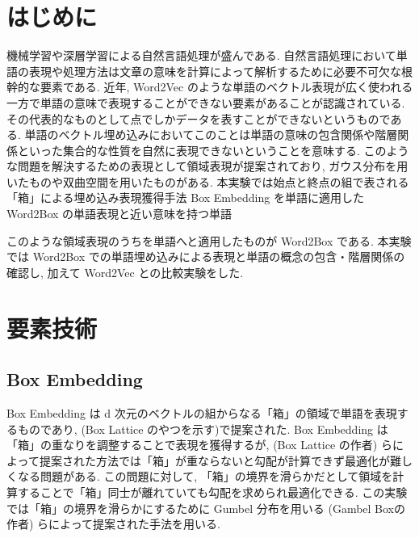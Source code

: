 \documentclass[twocolumn]{jarticle}     %
\begin{document}

\section{はじめに}
機械学習や深層学習による自然言語処理が盛んである. 
自然言語処理において単語の表現や処理方法は文章の意味を計算によって解析するために必要不可欠な根幹的な要素である.
近年, Word2Vec のような単語のベクトル表現が広く使われる一方で単語の意味で表現することができない要素があることが認識されている. 
その代表的なものとして点でしかデータを表すことができないというものである. 単語のベクトル埋め込みにおいてこのことは単語の意味の包含関係や階層関係といった集合的な性質を自然に表現できないということを意味する. 
このような問題を解決するための表現として領域表現が提案されており, ガウス分布を用いたものや双曲空間を用いたものがある. 本実験では始点と終点の組で表される「箱」による埋め込み表現獲得手法 Box Embedding を単語に適用した Word2Box の単語表現と近い意味を持つ単語

このような領域表現のうちを単語へと適用したものが Word2Box である. 本実験では Word2Box での単語埋め込みによる表現と単語の概念の包含・階層関係の確認し, 
加えて Word2Vec との比較実験をした.

\section{要素技術}
\subsection{Box Embedding}
Box Embedding は d 次元のベクトルの組からなる「箱」の領域で単語を表現するものであり, (Box Lattice のやつを示す)で提案された.
Box Embedding は「箱」の重なりを調整することで表現を獲得するが, (Box Lattice の作者) らによって提案された方法では「箱」が重ならないと勾配が計算できず最適化が難しくなる問題がある.
この問題に対して, 「箱」の境界を滑らかだとして領域を計算することで「箱」同士が離れていても勾配を求められ最適化できる. 
この実験では「箱」の境界を滑らかにするために Gumbel 分布を用いる (Gambel Boxの作者) らによって提案された手法を用いる. 
\end{document}
